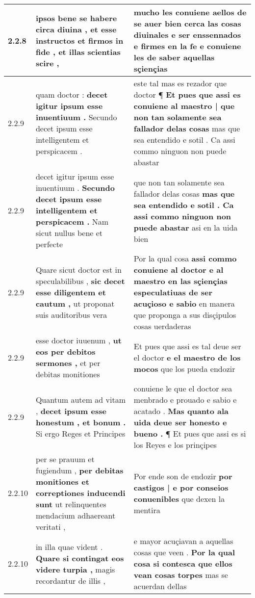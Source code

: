 \begin{tabular}{|p{1cm}|p{6.5cm}|p{6.5cm}|}
2.2.8 & ipsos bene se habere circa diuina , \textbf{ et esse instructos et firmos in fide , } et illas scientias scire , & mucho les conuiene aellos de se auer bien cerca las cosas diuinales \textbf{ e ser enssennados e firmes en la fe } e conuiene les de saber aquellas sçiençias \\\hline
2.2.9 & quam doctor : \textbf{ decet igitur ipsum esse inuentiuum . } Secundo decet ipsum esse intelligentem et perspicacem . & este tal mas es rezador que doctor ¶ \textbf{ Et pues que assi es conuiene al maestro | que non tan solamente sea fallador delas cosas } mas que sea entendido e sotil . Ca assi commo ninguon non puede abastar \\\hline
2.2.9 & decet igitur ipsum esse inuentiuum . \textbf{ Secundo decet ipsum esse intelligentem et perspicacem . } Nam sicut nullus bene et perfecte & que non tan solamente sea fallador delas cosas \textbf{ mas que sea entendido e sotil . Ca assi commo ninguon non puede abastar } asi en la uida bien \\\hline
2.2.9 & Quare sicut doctor est in speculabilibus , \textbf{ sic decet esse diligentem et cautum , } ut proponat suis auditoribus vera & Por la qual cosa \textbf{ assi commo conuiene al doctor e al maestro en las sçiençias especulatiuas de ser acuçioso e sabio } en manera que proponga a sus disçipulos cosas uerdaderas \\\hline
2.2.9 & esse doctor iuuenum , \textbf{ ut eos per debitos sermones , } et per debitas monitiones & Et pues que assi es tal deue ser el doctor \textbf{ e el maestro de los mocos } que los pueda endozir \\\hline
2.2.9 & Quantum autem ad vitam , \textbf{ decet ipsum esse honestum , et bonum . } Si ergo Reges et Principes & conuiene le que el doctor sea menbrado e prouado e sabio e acatado . \textbf{ Mas quanto ala uida deue ser honesto e bueno . } ¶ Et pues que assi es si los Reyes e los prinçipes \\\hline
2.2.10 & per se prauum et fugiendum , \textbf{ per debitas monitiones et correptiones inducendi sunt } ut relinquentes mendacium adhaereant veritati , & Por ende son de endozir \textbf{ por castigos | e por conseios conuenibles } que dexen la mentira \\\hline
2.2.10 & in illa quae vident . \textbf{ Quare si contingat eos videre turpia , } magis recordantur de illis , & e mayor acuçiavan a aquellas cosas que veen . \textbf{ Por la qual cosa si contesca que ellos vean cosas torpes } mas se acuerdan dellas \\\hline

\end{tabular}
